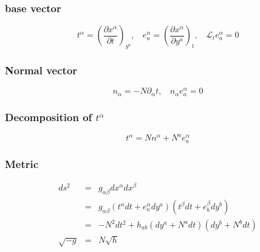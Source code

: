 \subsubsection{base vector}
\[t^{\alpha} = \left( \frac{\partial x^{\alpha}}{\partial t}\right)_{y^a}, \ \ \ \ e_a^{\alpha} = \left(\frac{\partial x^{\alpha}}{\partial y^a} \right)_t, \ \ \ \ \mathcal{L}_t e_a^{\alpha} = 0\]
\subsubsection{Normal vector}
\[n_{\alpha} = -N \partial_{\alpha}t, \ \ \ \ n_{\alpha} e_a^{\alpha} = 0\]
\subsubsection{Decomposition of $t^{\alpha}$}
\[t^{\alpha} = N n^{\alpha} + N^a e_a^{\alpha}\]
\subsubsection{Metric}
\begin{eqnarray}
ds^2 &=& g_{\alpha \beta} dx^{\alpha} dx^{\beta} \nonumber \\
&=& g_{\alpha \beta} (t^{\alpha} dt + e_a^{\alpha}dy^a) (t^{\beta} dt + e_b^{\beta}dy^{b}) \nonumber \\
&=& -N^2 dt^2 + h_{ab}(dy^a+N^a dt)(dy^b + N^b dt) \nonumber \\
\sqrt{-g} &=& N \sqrt{h} \nonumber
\end{eqnarray}

